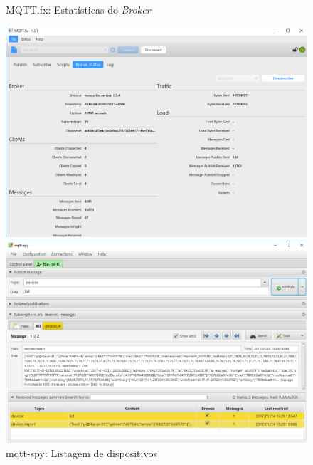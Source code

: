 \begin{figure}[htb]
	\centering
	\caption{\label{fig-mqttfx-stats}MQTT.fx: Estatísticas do \emph{Broker}}
	\includegraphics[width=1\textwidth]{052-gateway/mqtt/mqttfx-stats.png}
	\centering
	\caption{\label{fig-mqtt-spy-list}mqtt-spy: Listagem de dispositivos}
	\includegraphics[width=1\textwidth]{052-gateway/mqtt/mqtt-spy-list.png}
\end{figure}
